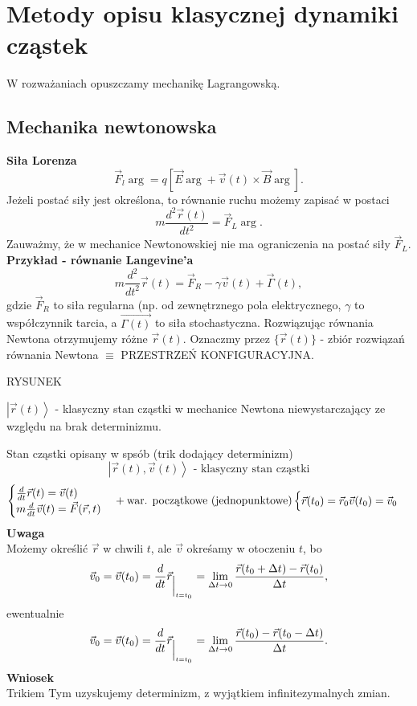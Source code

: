 \section{Metody opisu klasycznej dynamiki cząstek}
W rozważaniach opuszczamy mechanikę Lagrangowską. 
\subsection{Mechanika newtonowska}
\textbf{Siła Lorenza}
\begin{equation}\label{sila_lorenza}
	\vec{F}_l \arg = q [ \vec{E} \arg+\vec{v}(t)\times\vec{B}\arg].
\end{equation}
Jeżeli postać siły jest określona, to równanie ruchu możemy 
zapisać w postaci
\begin{equation}
	m\frac{d^2\vec{r}(t)}{dt^2}=\vec{F}_L \arg  .
\end{equation}
Zauważmy, że w mechanice Newtonowskiej nie ma ograniczenia na 
postać siły $\vec{F}_L$.
\textbf{Przykład - równanie Langevine'a}
$$ m\frac{d^2}{dt^2} \vec{r}(t) = \vec{F}_R - \gamma\vec{v}(t) +
\vec{\Gamma}(t),$$
gdzie $\vec{F}_R$ to siła regularna (np. od zewnętrznego pola 
elektrycznego, $\gamma$ to współczynnik tarcia, a $\vec{\Gamma(t)}$ 
to siła stochastyczna.
Rozwiązując równania Newtona otrzymujemy różne $\vec{r}(t)$. 
Oznaczmy przez $\{ \vec{r}(t) \}$ - zbiór rozwiązań równania Newtona
$\equiv$ PRZESTRZEŃ KONFIGURACYJNA.

RYSUNEK


$\left|\vec{r}(t)\right> $ - klasyczny stan cząstki w mechanice Newtona 
niewystarczający ze względu na brak determinizmu.

Stan cząstki opisany w spsób (trik dodający determinizm) $$\left| \vec{r}(t)
,\vec{v}(t) \right> \mbox{ - klasyczny stan cząstki}$$
$$
\begin{cases} 
	\frac{d}{dt} \vec{r}(t)=\vec{v}(t) &\\
	m\frac{d}{dt} \vec{v}(t)=\vec{F}(\vec{r},t)
\end{cases} + \mbox{war. początkowe (jednopunktowe)} 
\begin{cases}
	\vec{r}(t_0)=\vec{r}_0
	\vec{v}(t_0)=\vec{v}_0
\end{cases}
$$
\textbf{Uwaga}\\
Możemy określić $\vec{r}$ w chwili $t$, ale $\vec{v}$ okreśamy w otoczeniu $t$,
bo
$$\vec{v}_0 = \vec{v}(t_0) = \frac{d}{dt} \vec{r}_{\Big|_{t=t_0}} = \lim_{\Delta t \to 0}
\frac{\vec{r}(t_0+\Delta t)-\vec{r}(t_0)}{\Delta t},$$
ewentualnie
$$\vec{v}_0 = \vec{v}(t_0) = \frac{d}{dt} \vec{r}_{\Big|_{t=t_0}} = \lim_{\Delta t \to 0}
\frac{\vec{r}(t_0)-\vec{r}(t_0-\Delta t)}{\Delta t}.$$
\textbf{Wniosek}\\
Trikiem Tym uzyskujemy determinizm, z wyjątkiem infinitezymalnych zmian.

